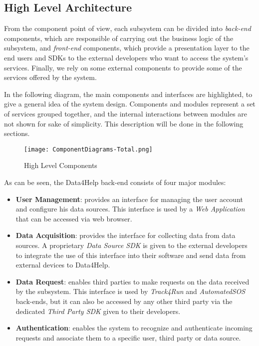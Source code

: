\subsection{High Level Architecture}
From the component point of view, each subsystem can be divided into \textit{back-end} components, which are responsible of carrying out the business logic of the subsystem, and \textit{front-end} components, which provide a presentation layer to the end users and SDKs to the external developers who want to access the system's services. 
Finally, we rely on some external components to provide some of the services offered by the system.

In the following diagram, the main components and interfaces are highlighted, to give a general idea of the system design.
Components and modules represent a set of services grouped together, and the internal interactions between modules are not shown for sake of simplicity. This description will be done in the following sections.

\FloatBarrier
\begin{figure}[!h]
	\centering
	\texttt{[image: ComponentDiagrams-Total.png]}
	\caption{High Level Components}
\end{figure}
\FloatBarrier

As can be seen, the Data4Help back-end consists of four major modules:

\begin{itemize}
	\item \textbf{User Management}: provides an interface for managing the user account and configure his data sources. This interface is used by a \textit{Web Application} that can be accessed via web browser.
	\item \textbf{Data Acquisition}: provides the interface for collecting data from data sources. A proprietary \textit{Data Source SDK} is given to the external developers to integrate the use of this interface into their software and send data from external devices to Data4Help.
	\item \textbf{Data Request}: enables third parties to make requests on the data received by the subsystem. This interface is used by \textit{Track4Run} and \textit{AutomatedSOS} back-ends, but it can also be accessed by any other third party via the dedicated \textit{Third Party SDK} given to their developers.
	\item \textbf{Authentication}: enables the system to recognize and authenticate incoming requests and associate them to a specific user, third party or data source.
\end{itemize}

